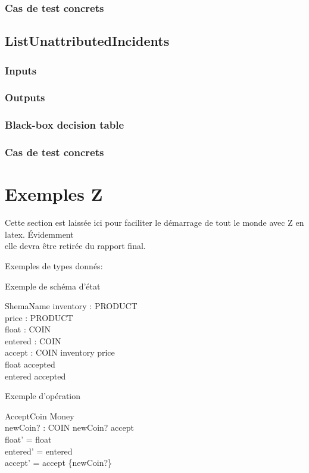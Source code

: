 \documentclass[12pt]{article}
\begin{document}
\subsubsection{Cas de test concrets}

\subsection{ListUnattributedIncidents}

\subsubsection{Inputs}

\subsubsection{Outputs}

\subsubsection{Black-box decision table}

\subsubsection{Cas de test concrets}

\section{Exemples Z}
Cette section est laissée ici pour faciliter le démarrage de tout le monde avec Z en latex.  Évidemment\\ elle devra être retirée du rapport final.

Exemples de types donnés:
\begin{zed}
\end{zed}


Exemple de schéma d'état
\begin{schema}{ShemaName}
  inventory : \bag PRODUCT\\
  price : PRODUCT \pfun \nat\\
  float : \bag COIN\\
  entered : \bag COIN\\
  accept : \power COIN
  \where
  \dom inventory \subseteq \dom price\\
  \dom float \subseteq accepted\\
  \dom entered \subseteq accepted
\end{schema}

Exemple d'opération
\begin{schema}{AcceptCoin}
\Delta Money\\
newCoin? : COIN
\where
newCoin? \notin accept\\
float' = float\\
entered' = entered\\
accept' = accept \cup \{newCoin?\}
\end{schema}
\end{document}
